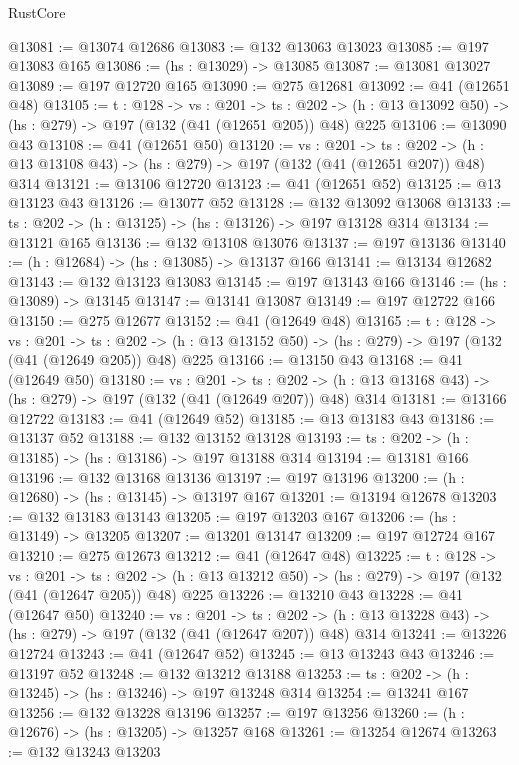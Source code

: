 \begin{lexlean}{RustCore}
\begin{coremodule}
@13081 := @13074 @12686
@13083 := @132 @13063 @13023
@13085 := @197 @13083 @165
@13086 := (hs : @13029) -> @13085
@13087 := @13081 @13027
@13089 := @197 @12720 @165
@13090 := @275 @12681
@13092 := @41 (@12651 @48)
@13105 := {t : @128} ->
  {vs : @201} ->
  {ts : @202} -> (h : @13 @13092 @50) -> (hs : @279) -> @197 (@132 (@41 (@12651 @205)) @48) @225
@13106 := @13090 @43
@13108 := @41 (@12651 @50)
@13120 := {vs : @201} ->
  {ts : @202} -> (h : @13 @13108 @43) -> (hs : @279) -> @197 (@132 (@41 (@12651 @207)) @48) @314
@13121 := @13106 @12720
@13123 := @41 (@12651 @52)
@13125 := @13 @13123 @43
@13126 := @13077 @52
@13128 := @132 @13092 @13068
@13133 := {ts : @202} -> (h : @13125) -> (hs : @13126) -> @197 @13128 @314
@13134 := @13121 @165
@13136 := @132 @13108 @13076
@13137 := @197 @13136
@13140 := (h : @12684) -> (hs : @13085) -> @13137 @166
@13141 := @13134 @12682
@13143 := @132 @13123 @13083
@13145 := @197 @13143 @166
@13146 := (hs : @13089) -> @13145
@13147 := @13141 @13087
@13149 := @197 @12722 @166
@13150 := @275 @12677
@13152 := @41 (@12649 @48)
@13165 := {t : @128} ->
  {vs : @201} ->
  {ts : @202} -> (h : @13 @13152 @50) -> (hs : @279) -> @197 (@132 (@41 (@12649 @205)) @48) @225
@13166 := @13150 @43
@13168 := @41 (@12649 @50)
@13180 := {vs : @201} ->
  {ts : @202} -> (h : @13 @13168 @43) -> (hs : @279) -> @197 (@132 (@41 (@12649 @207)) @48) @314
@13181 := @13166 @12722
@13183 := @41 (@12649 @52)
@13185 := @13 @13183 @43
@13186 := @13137 @52
@13188 := @132 @13152 @13128
@13193 := {ts : @202} -> (h : @13185) -> (hs : @13186) -> @197 @13188 @314
@13194 := @13181 @166
@13196 := @132 @13168 @13136
@13197 := @197 @13196
@13200 := (h : @12680) -> (hs : @13145) -> @13197 @167
@13201 := @13194 @12678
@13203 := @132 @13183 @13143
@13205 := @197 @13203 @167
@13206 := (hs : @13149) -> @13205
@13207 := @13201 @13147
@13209 := @197 @12724 @167
@13210 := @275 @12673
@13212 := @41 (@12647 @48)
@13225 := {t : @128} ->
  {vs : @201} ->
  {ts : @202} -> (h : @13 @13212 @50) -> (hs : @279) -> @197 (@132 (@41 (@12647 @205)) @48) @225
@13226 := @13210 @43
@13228 := @41 (@12647 @50)
@13240 := {vs : @201} ->
  {ts : @202} -> (h : @13 @13228 @43) -> (hs : @279) -> @197 (@132 (@41 (@12647 @207)) @48) @314
@13241 := @13226 @12724
@13243 := @41 (@12647 @52)
@13245 := @13 @13243 @43
@13246 := @13197 @52
@13248 := @132 @13212 @13188
@13253 := {ts : @202} -> (h : @13245) -> (hs : @13246) -> @197 @13248 @314
@13254 := @13241 @167
@13256 := @132 @13228 @13196
@13257 := @197 @13256
@13260 := (h : @12676) -> (hs : @13205) -> @13257 @168
@13261 := @13254 @12674
@13263 := @132 @13243 @13203

\end{coremodule}
\end{lexlean}
